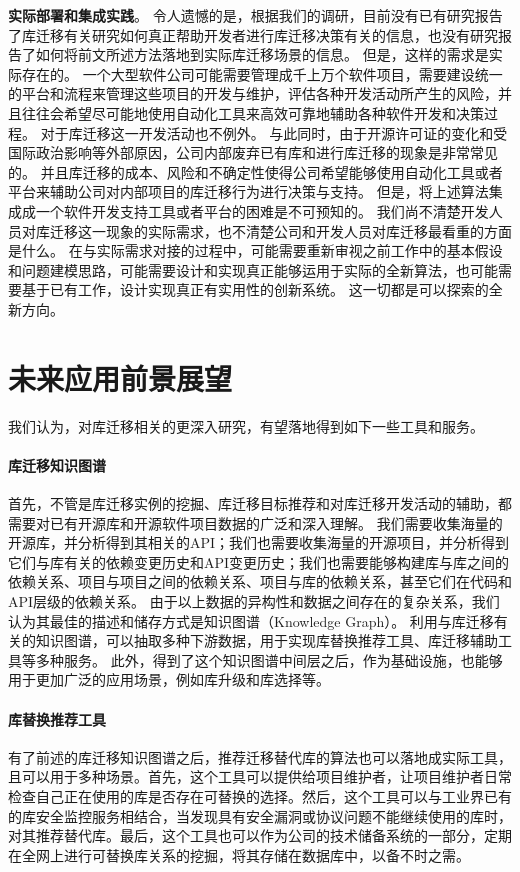 \documentclass[UTF8]{ctexart}
\begin{document}
\textbf{实际部署和集成实践}。
令人遗憾的是，根据我们的调研，目前没有已有研究报告了库迁移有关研究如何真正帮助开发者进行库迁移决策有关的信息，也没有研究报告了如何将前文所述方法落地到实际库迁移场景的信息。
但是，这样的需求是实际存在的。
一个大型软件公司可能需要管理成千上万个软件项目，需要建设统一的平台和流程来管理这些项目的开发与维护，评估各种开发活动所产生的风险，并且往往会希望尽可能地使用自动化工具来高效可靠地辅助各种软件开发和决策过程。
对于库迁移这一开发活动也不例外。
与此同时，由于开源许可证的变化和受国际政治影响等外部原因，公司内部废弃已有库和进行库迁移的现象是非常常见的。
并且库迁移的成本、风险和不确定性使得公司希望能够使用自动化工具或者平台来辅助公司对内部项目的库迁移行为进行决策与支持。
但是，将上述算法集成成一个软件开发支持工具或者平台的困难是不可预知的。
我们尚不清楚开发人员对库迁移这一现象的实际需求，也不清楚公司和开发人员对库迁移最看重的方面是什么。
在与实际需求对接的过程中，可能需要重新审视之前工作中的基本假设和问题建模思路，可能需要设计和实现真正能够运用于实际的全新算法，也可能需要基于已有工作，设计实现真正有实用性的创新系统。
这一切都是可以探索的全新方向。

\section{未来应用前景展望}

我们认为，对库迁移相关的更深入研究，有望落地得到如下一些工具和服务。

\paragraph{库迁移知识图谱}
首先，不管是库迁移实例的挖掘、库迁移目标推荐和对库迁移开发活动的辅助，都需要对已有开源库和开源软件项目数据的广泛和深入理解。
我们需要收集海量的开源库，并分析得到其相关的API；我们也需要收集海量的开源项目，并分析得到它们与库有关的依赖变更历史和API变更历史；我们也需要能够构建库与库之间的依赖关系、项目与项目之间的依赖关系、项目与库的依赖关系，甚至它们在代码和API层级的依赖关系。
由于以上数据的异构性和数据之间存在的复杂关系，我们认为其最佳的描述和储存方式是知识图谱（Knowledge Graph）。
利用与库迁移有关的知识图谱，可以抽取多种下游数据，用于实现库替换推荐工具、库迁移辅助工具等多种服务。
此外，得到了这个知识图谱中间层之后，作为基础设施，也能够用于更加广泛的应用场景，例如库升级和库选择等。

\paragraph{库替换推荐工具}
有了前述的库迁移知识图谱之后，推荐迁移替代库的算法也可以落地成实际工具，且可以用于多种场景。首先，这个工具可以提供给项目维护者，让项目维护者日常检查自己正在使用的库是否存在可替换的选择。然后，这个工具可以与工业界已有的库安全监控服务相结合，当发现具有安全漏洞或协议问题不能继续使用的库时，对其推荐替代库。最后，这个工具也可以作为公司的技术储备系统的一部分，定期在全网上进行可替换库关系的挖掘，将其存储在数据库中，以备不时之需。
\end{document}
